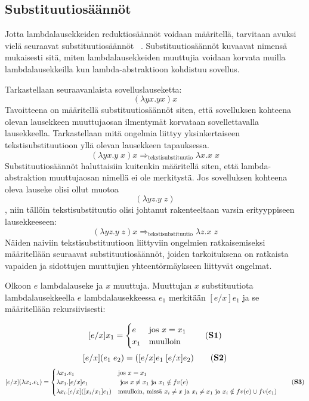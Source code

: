 \subsection{Substituutiosäännöt}
Jotta lambdalausekkeiden reduktiosäännöt voidaan määritellä, tarvitaan avuksi vielä seuraavat substituutiosäännöt ~\cite[s.~8]{Hudak89}. Substituutiosäännöt kuvaavat nimensä mukaisesti sitä, miten lambdalausekkeiden muuttujia voidaan korvata muilla lambdalausekkeilla kun lambda-abstraktioon kohdistuu sovellus.
\par
Tarkastellaan seuraavanlaista sovelluslauseketta:
\[ (\lambda yx . yx) x \]
Tavoitteena on määritellä substituutiosäännöt siten, että sovelluksen kohteena olevan lausekkeen muuttujaosan ilmentymät korvataan sovellettavalla lausekkeella. Tarkastellaan mitä ongelmia liittyy yksinkertaiseen tekstisubstituutioon yllä olevan lausekkeen tapauksessa.
\[  
	(\lambda yx . y \; x) x  \Longrightarrow_{\text{tekstisubstituutio}}
	\lambda x . x \; x
\]
Substituutiosäännöt haluttaisiin kuitenkin määritellä siten, että lambda-abstraktion muuttujaosan nimellä ei ole merkitystä. Jos sovelluksen kohteena oleva lauseke olisi ollut muotoa
\[  (\lambda yz . y \; z)  \],
niin tällöin tekstisubstituutio olisi johtanut rakenteeltaan varsin erityyppiseen lausekkeeseen:
\[  
	(\lambda yz . y \; z) x  \Longrightarrow_{\text{tekstisubstituutio}}
	\lambda z . x \; z
\]
Näiden naiviin tekstisubstituutioon liittyviin ongelmien ratkaisemiseksi määritellään seuraavat substituutiosäännöt, joiden tarkoituksena on ratkaista vapaiden ja sidottujen muuttujien yhteentörmäykseen liittyvät ongelmat.

\begin{maar}[substituutiosäännöt]
Olkoon $e$ lambdalauseke ja $x$ muuttuja. Muuttujan $x$ substituutiota lambdalausekkeella $e$ lambdalausekkeessa $e_{1}$ merkitään $[e/x] e_{1}$ ja se määritellään rekursiivisesti:  

\[[e/x]x_{1} = 
        \begin{cases}
                e & \text{jos } x = x_{1} \\
                x_{1} & \text{muulloin}
        \end{cases}
        \label{eq:S1} \tag{\textbf{S1}}
\]
\[ [e/x](e_{1} \; e_{2}) = ([e/x]e_{1} \; [e/x]e_{2}) \label{eq:S2} \tag{\textbf{S2}}\]
\[[e/x](\lambda x_{1}.e_{1}) = 
        \begin{cases}
                \lambda x_{1}.e_{1} & \text{jos } x = x_{1} \\
                \lambda x_{1}.[e/x]e_{1} & \text{ jos } x \neq x_{1} \text{ ja } x_{1} \notin fv(e) \\
                \lambda x_{i}.[e/x]([x_{i}/x_{1}]e_{1}) & \text{muulloin, missä } x_{i} \neq x \text { ja } x_{i} \neq x_{1} \text{ ja } x_{i} \notin fv(e) \cup fv(e_{1})
        \end{cases}
 \label{eq:S3} \tag{\textbf{S3}}       
\]
\end{maar} 

